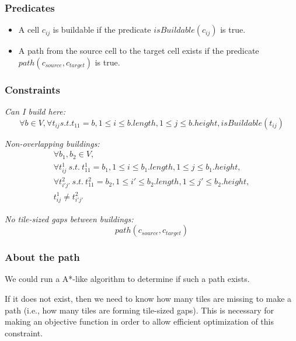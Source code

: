 \documentclass[a4paper,11pt]{article}
\begin{document}
\subsubsection{Predicates}

\begin{itemize}
\item A cell $c_{ij}$ is buildable if the predicate {\bf $isBuildable(c_{ij})$} is
  true.
\item A  path from the  source cell to  the target cell exists  if the
  predicate {\bf $path(c_{source}, c_{target})$} is true.
\end{itemize}

\subsubsection{Constraints}

{\em Can I build here:}
\begin{displaymath}
  \forall  b \in V,  \forall t_{ij}  s.t. t_{11}  = b,  1 \leq  i \leq
  b.length, 1 \leq j \leq b.height, isBuildable(t_{ij})
\end{displaymath}

\noindent
{\em Non-overlapping buildings:}
\begin{displaymath}
  \begin{array}{l}
    \forall b_1, b_2 \in V,\\
    \forall t^1_{ij}\  s.t.\ t^1_{11} = b_1,  1 \leq i  \leq b_1.length, 1
    \leq j \leq b_1.height,\\
    \forall t^2_{i'j'}\ s.t.\ t^2_{11} = b_2, 1 \leq i' \leq b_2.length, 1
    \leq j' \leq b_2.height,\\
    t^1_{ij} \neq t^2_{i'j'}
  \end{array}
\end{displaymath}

\noindent
{\em  No tile-sized gaps  between buildings:}
\begin{displaymath}
  path(c_{source}, c_{target})
\end{displaymath}

\subsubsection{About the path}

We  could  run  a  A*-like  algorithm  to determine  if  such  a  path
exists.

If it does not exist, then  we need to know how many tiles are
missing to  make a path (i.e.,  how many tiles  are forming tile-sized
gaps). This is necessary for  making an objective function in order to
allow efficient optimization of this constraint.
\end{document}
